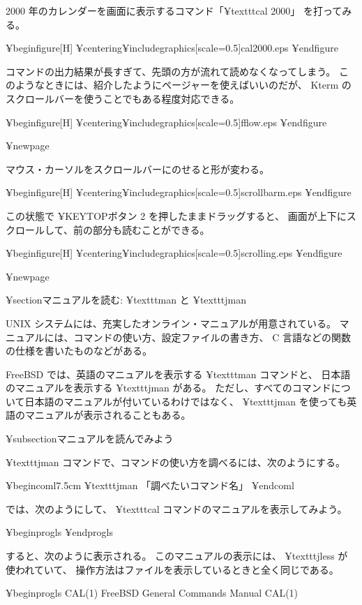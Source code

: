 2000 年のカレンダーを画面に表示するコマンド「¥texttt{cal 2000}」
を打ってみる。

¥begin{figure}[H]
¥centering{¥includegraphics[scale=0.5]{cal2000.eps}}
¥end{figure}

コマンドの出力結果が長すぎて、先頭の方が流れて読めなくなってしまう。
このようなときには、紹介したようにページャーを使えばいいのだが、
Kterm のスクロールバーを使うことでもある程度対応できる。

¥begin{figure}[H]
¥centering{¥includegraphics[scale=0.5]{fflow.eps}}
¥end{figure}

¥newpage

マウス・カーソルをスクロールバーにのせると形が変わる。

¥begin{figure}[H]
¥centering{¥includegraphics[scale=0.5]{scrollbarm.eps}}
¥end{figure}

この状態で ¥KEYTOP{ボタン 2} を押したままドラッグすると、
画面が上下にスクロールして、前の部分も読むことができる。

¥begin{figure}[H]
¥centering{¥includegraphics[scale=0.5]{scrolling.eps}}
¥end{figure}

¥newpage

¥section{マニュアルを読む: ¥texttt{man} と ¥texttt{jman}}

 UNIX システムには、充実したオンライン・マニュアルが用意されている。
マニュアルには、コマンドの使い方、設定ファイルの書き方、
 C 言語などの関数の仕様を書いたものなどがある。

 FreeBSD では、英語のマニュアルを表示する ¥texttt{man} コマンドと、
日本語のマニュアルを表示する ¥texttt{jman} がある。
ただし、すべてのコマンドについて日本語のマニュアルが付いているわけではなく、
 ¥texttt{jman} を使っても英語のマニュアルが表示されることもある。

¥subsection{マニュアルを読んでみよう}

 ¥texttt{jman} コマンドで、コマンドの使い方を調べるには、次のようにする。

¥begin{coml}{7.5cm}
¥texttt{jman} 「調べたいコマンド名」
¥end{coml}

では、次のようにして、 ¥texttt{cal} コマンドのマニュアルを表示してみよう。

¥begin{progls}
¥end{progls}

すると、次のように表示される。
このマニュアルの表示には、 ¥texttt{jless} が使われていて、
操作方法はファイルを表示しているときと全く同じである。

¥begin{progls}
CAL(1)                  FreeBSD General Commands Manual                 CAL(1)

